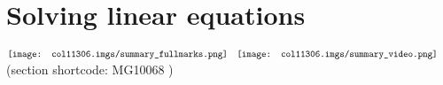 % 
%         
% 
%       
%             
%     
%         
%         
% 
%       
%     
\section{Solving linear equations}
\nopagebreak
\label{m39241} $ \hspace{-5pt}\begin{array}{cccccccccccc}   \texttt{[image: col11306.imgs/summary\_fullmarks.png]} &   \texttt{[image: col11306.imgs/summary\_video.png]} &   \end{array} $ \hspace{2 pt}\raisebox{-5 pt}{} {(section shortcode: MG10068 )} \par 
           
